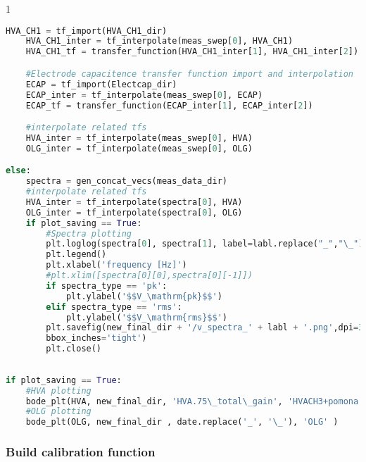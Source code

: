 \begin{spacing}{1}
\begin{lstlisting}[frame=single, language=Python]
    HVA_CH1 = tf_import(HVA_CH1_dir)                                         # HVA CH1 import and interpolation (interpolate to transfer function frequency vector)
    HVA_CH1_inter = tf_interpolate(meas_swep[0], HVA_CH1)
    HVA_CH1_tf = transfer_function(HVA_CH1_inter[1], HVA_CH1_inter[2])

    #Electrode capacitence transfer function import and interpolation
    ECAP = tf_import(Electcap_dir)                                           # Import and interpolate LPF measurement (part of frequency dependent drive to electrodes)
    ECAP_inter = tf_interpolate(meas_swep[0], ECAP)
    ECAP_tf = transfer_function(ECAP_inter[1], ECAP_inter[2])

    #interpolate related tfs
    HVA_inter = tf_interpolate(meas_swep[0], HVA)                            # HVA CH3 and OLG interpolation
    OLG_inter = tf_interpolate(meas_swep[0], OLG)

else:                                                                        # if the measurement is not a transfer function (spectra measurement)
    spectra = gen_concat_vecs(meas_data_dir)                                 # changed from concat_vecs to gen_concat_vecs (07-25-2021)
    #interpolate related tfs
    HVA_inter = tf_interpolate(spectra[0], HVA)                              # HVA CH3 and OLG interpolation
    OLG_inter = tf_interpolate(spectra[0], OLG)
    if plot_saving == True:
        #Spectra plotting
        plt.loglog(spectra[0], spectra[1], label=labl.replace("_","\_"))
        plt.legend()
        plt.xlabel('frequency [Hz]')
        #plt.xlim([spectra[0][0],spectra[0][-1]])
        if spectra_type == 'pk':
            plt.ylabel('$$V_\mathrm{pk}$$')
        elif spectra_type == 'rms':
            plt.ylabel('$$V_\mathrm{rms}$$')
        plt.savefig(new_final_dir + '/v_spectra_' + labl + '.png',dpi=300, \
        bbox_inches='tight')
        plt.close()
        
        
if plot_saving == True:                                                      # plot and HVACH3 and OLG if requested
    #HVA plotting
    bode_plt(HVA, new_final_dir, 'HVA.75\_total\_gain', 'HVACH3+pomona')
    #OLG plotting
    bode_plt(OLG, new_final_dir , date.replace('_', '\_'), 'OLG' )
\end{lstlisting} \end{spacing}

\subsubsection{Build calibration
function}\label{build-calibration-function}

